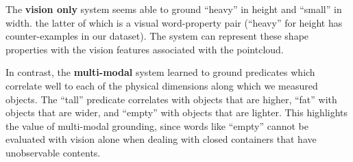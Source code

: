 The \textbf{vision only} system seems able to ground ``heavy'' in height and ``small'' in width. the latter of which is a visual word-property pair (``heavy'' for height has counter-examples in our dataset).
The system can represent these shape properties with the vision features associated with the pointcloud.

In contrast, the \textbf{multi-modal} system learned to ground predicates which correlate well to each of the physical dimensions along which we measured objects.
The ``tall'' predicate correlates with objects that are higher, ``fat'' with objects that are wider, and ``empty'' with objects that are lighter.
This highlights the value of multi-modal grounding, since words like ``empty'' cannot be evaluated with vision alone when dealing with closed containers that have unobservable contents.
